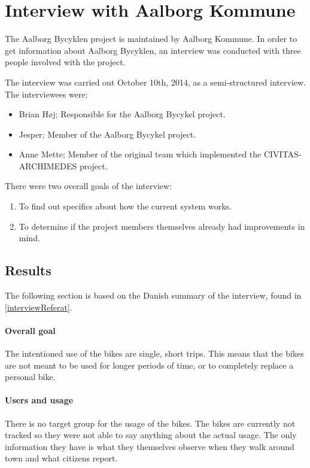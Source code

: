 \section{Interview with Aalborg Kommune}
The Aalborg Bycyklen project is maintained by Aalborg Kommune.
In order to get information about Aalborg Bycyklen, an interview was conducted with three people involved with the project.

The interview was carried out October 10th, 2014, as a semi-structured interview.
The interviewees were:
\begin{itemize}
\item Brian Høj; Responsible for the Aalborg Bycykel project.
\item Jesper; Member of the Aalborg Bycykel project.
\item Anne Mette; Member of the original team which implemented the CIVITAS-ARCHIMEDES project\cite{aalborgbycyklenbagcyklen}.
\end{itemize}

\noindent There were two overall goals of the interview:
\begin{enumerate}
\item To find out specifics about how the current system works.
\item To determine if the project members themselves already had improvements in mind.
\end{enumerate}

\subsection{Results} \label{interview:goals}
The following section is based on the Danish summary of the interview, found in \cref{interviewReferat}.

\paragraph{Overall goal}
The intentioned use of the bikes are single, short trips.
This means that the bikes are not meant to be used for longer periods of time, or to completely replace a personal bike.

\paragraph{Users and usage}
There is no target group for the usage of the bikes.
The bikes are currently not tracked so they were not able to say anything about the actual usage.
The only information they have is what they themselves observe when they walk around town and what citizens report.

